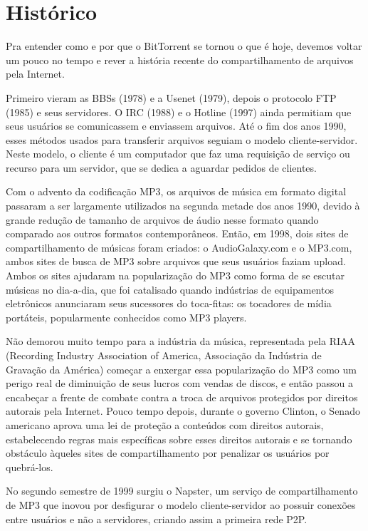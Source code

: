 \chapter{Histórico}

Pra entender como e por que o BitTorrent se tornou o que é hoje, devemos voltar um pouco no tempo e rever a história recente do compartilhamento de arquivos pela Internet. 

Primeiro vieram as BBSs (1978) e a Usenet (1979), depois o protocolo FTP (1985) e seus servidores. O IRC (1988) e o  Hotline (1997) ainda permitiam que seus usuários se comunicassem e enviassem arquivos. Até o fim dos anos 1990, esses métodos usados para transferir arquivos seguiam o modelo cliente-servidor. Neste modelo, o cliente é um computador que faz uma requisição de serviço ou recurso para um servidor, que se dedica a aguardar pedidos de clientes. 

Com o advento da codificação MP3, os arquivos de música em formato digital passaram a ser largamente utilizados na segunda metade dos anos 1990, devido à grande redução de tamanho de arquivos de áudio nesse formato quando comparado aos outros formatos contemporâneos. Então, em 1998, dois sites de compartilhamento de músicas foram criados: o AudioGalaxy.com e o MP3.com, ambos sites de busca de MP3 sobre arquivos que seus usuários faziam upload. Ambos os sites ajudaram na popularização do MP3 como forma de se escutar músicas no dia-a-dia, que foi catalisado quando indústrias de equipamentos eletrônicos anunciaram seus sucessores do toca-fitas: os tocadores de mídia portáteis, popularmente conhecidos como MP3 players.

Não demorou muito tempo para a indústria da música, representada pela RIAA (Recording Industry Association of America, Associação da Indústria de Gravação da América) começar a enxergar essa popularização do MP3 como um perigo real de diminuição de seus lucros com vendas de discos, e então passou a encabeçar a frente de combate contra a troca de arquivos protegidos por direitos autorais pela Internet. Pouco tempo depois, durante o governo Clinton, o Senado americano aprova uma lei de proteção a conteúdos com direitos autorais, estabelecendo regras mais específicas sobre esses direitos autorais e se tornando obstáculo àqueles sites de compartilhamento por penalizar os usuários por quebrá-los. 

No segundo semestre de 1999 surgiu o Napster, um serviço  de compartilhamento de MP3 que inovou por desfigurar o modelo cliente-servidor ao possuir conexões entre usuários e não a servidores, criando assim a primeira rede P2P.

